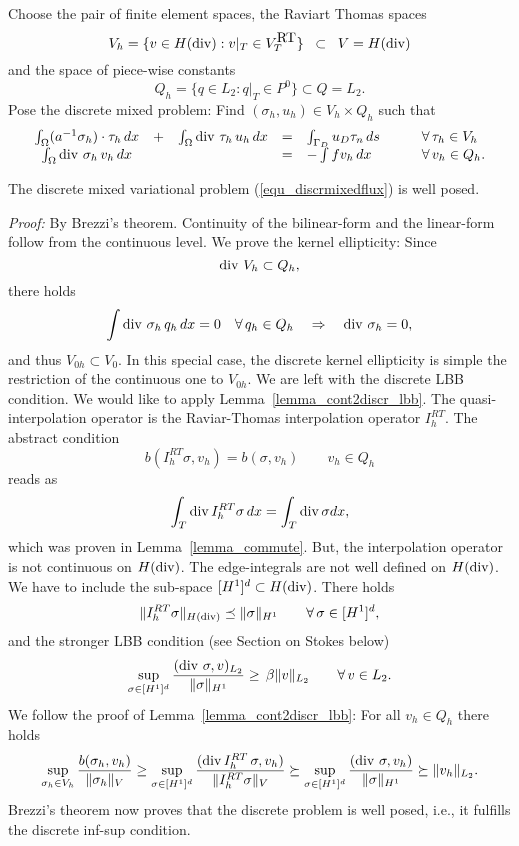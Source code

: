 Choose the pair of finite element spaces, the Raviart Thomas spaces
$$
V_h = \{ v \in H(\operatorname{div}) : v|_T \in V_T^{\mbox{RT}} \} \; \; \subset \; \;
V = H(\operatorname{div})
$$
and the space of piece-wise constants
$$
Q_h = \{ q \in L_2 : q|_T \in P^0 \}  \subset Q = L_2.
$$
Pose the discrete mixed problem: Find $(\sigma_h, u_h) \in V_h \times Q_h$
such that
\begin{equation} \label{equ_discrmixedflux}
\begin{array}{ccccll}
\int_\Omega (a^{-1} \sigma_h) \cdot \tau_h \, dx & + & 
\int_\Omega \operatorname{div} \, \tau_h  \, u_h \, dx & = & \int_{\Gamma_D} u_D \tau _n \, ds \qquad & \forall \, \tau_h \in V_h \\
\int_\Omega \operatorname{div} \, \sigma_h \, v_h \, dx & & & = & - \int f v_h \, dx \qquad & \forall \, v_h \in Q_h.
\end{array}
\end{equation}
%
\begin{lemma} The discrete mixed variational 
problem (\ref{equ_discrmixedflux}) is well posed.
\end{lemma}
{\em Proof:} By Brezzi's theorem. Continuity of the bilinear-form and
the linear-form follow from the continuous level. We prove the
kernel ellipticity: Since
$$
\operatorname{div} \, V_h \subset Q_h, 
$$
there holds
$$
\int \operatorname{div} \, \sigma_h \, q_h \, dx = 0 \quad \forall \, q_h \in Q_h
\quad \Rightarrow \quad \operatorname{div} \, \sigma_h = 0,
$$
and thus $V_{0h} \subset V_0$. In this special case, the discrete
kernel ellipticity is simple the restriction of the continuous one to
$V_{0h}$.
We are left with the discrete LBB condition. We would like to apply
Lemma~\ref{lemma_cont2discr_lbb}. The quasi-interpolation operator 
is the Raviar-Thomas interpolation operator $I_h^{RT}$. The abstract
condition
$$
b(I_h^{RT} \sigma , v_h) = b(\sigma, v_h) \qquad v_h \in Q_h
$$
reads as
$$
\int_T \operatorname{div} I_h^{RT} \sigma \, dx = \int_T \operatorname{div} \sigma dx,
$$
which was proven in Lemma~\ref{lemma_commute}. But, the interpolation
operator is not continuous on $H(\operatorname{div})$. The edge-integrals are not
well defined on $H(\operatorname{div})$. We have to include the
sub-space $[H^1]^d \subset H(\operatorname{div})$. There holds
$$
\| I_h^{RT} \sigma \|_{H(\operatorname{div})} \preceq \| \sigma \|_{H^1} \qquad \forall \, \sigma \in [H^1]^d,
$$
and the stronger LBB condition (see Section on Stokes below)
$$
\sup_{\sigma \in [H^1]^d} \frac{ (\operatorname{div} \, \sigma, v)_{L_2} } { \| \sigma \|_{H^1}} \geq \, \beta \| v \|_{L_2} \qquad \forall \, v \in L_2.
$$
We follow the proof of Lemma~\ref{lemma_cont2discr_lbb}:
 For all $v_h \in Q_h$ there holds
$$
\sup_{\sigma_h \in V_h} \frac { b(\sigma_h, v_h) }{\| \sigma_h \|_V}
\geq 
\sup_{\sigma \in [H^1]^d} \frac{ (\operatorname{div} I_h^{RT} \, \sigma, v_h)}{\| I_h^{RT} \sigma \|_V}
\succeq 
\sup_{\sigma \in [H^1]^d} \frac{ (\operatorname{div} \, \sigma, v_h) }{  \| \sigma \|_{H^1} }
\succeq
\| v_h \|_{L_2}.
$$
Brezzi's theorem now proves that the discrete problem is well posed, i.e.,
it fulfills the discrete inf-sup condition.

